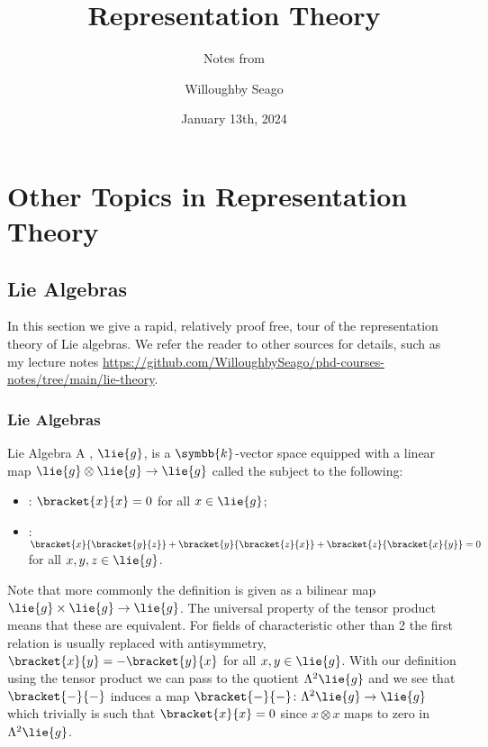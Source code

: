 \documentclass[fleqn]{NotesClass}
\title{Representation Theory}
\author{Willoughby Seago}
\date{January 13th, 2024}
\subtitle{Notes from}
\renewcommand{\field}{\symbb{k}}
\begin{document}
    \frontmatter
    \titlepage
    \tableofcontents
    \mainmatter
    
    
    
    
    \part{Other Topics in Representation Theory}
    \chapter{Lie Algebras}
    In this section we give a rapid, relatively proof free, tour of the representation theory of Lie algebras.
    We refer the reader to other sources for details, such as my lecture notes \url{https://github.com/WilloughbySeago/phd-courses-notes/tree/main/lie-theory}.
    
    \section{Lie Algebras}
    \begin{dfn}{Lie Algebra}{}
        A , \(\lie{g}\), is a \(\field\)-vector space equipped with a linear map \(\lie{g} \otimes \lie{g} \to \lie{g}\) called the  subject to the following:
        \begin{itemize}
            \item {}: \(\bracket{x}{x} = 0\) for all \(x \in \lie{g}\);
            \item {}: \(\bracket{x}{\bracket{y}{z}} + \bracket{y}{\bracket{z}{x}} + \bracket{z}{\bracket{x}{y}} = 0\) for all \(x, y, z \in \lie{g}\).
        \end{itemize}
    \end{dfn}
    
    Note that more commonly the definition is given as a bilinear map \(\lie{g} \times \lie{g} \to \lie{g}\).
    The universal property of the tensor product means that these are equivalent.
    For fields of characteristic other than 2 the first relation is usually replaced with antisymmetry, \(\bracket{x}{y} = -\bracket{y}{x}\) for all \(x, y \in \lie{g}\).
    With our definition using the tensor product we can pass to the quotient \(\Lambda^2\lie{g}\) and we see that \(\bracket{-}{-}\) induces a map \(\bracket{-}{-} \colon \Lambda^2\lie{g} \to \lie{g}\) which trivially is such that \(\bracket{x}{x} = 0\) since \(x \otimes x\) maps to zero in \(\Lambda^2 \lie{g}\).
    
\end{document}
